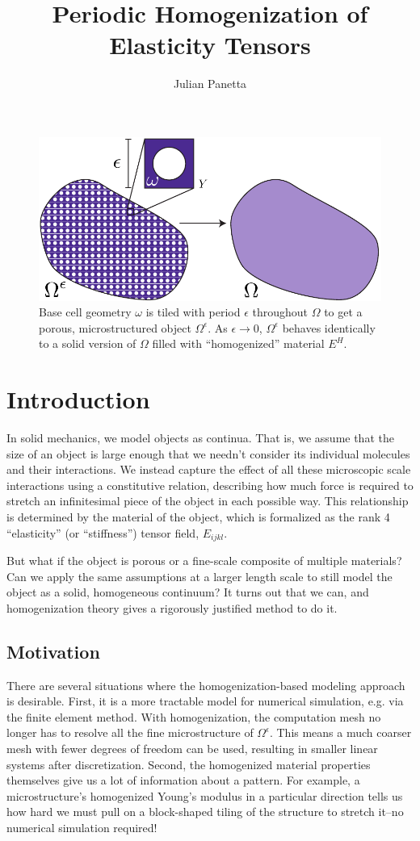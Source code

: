 \documentclass[10pt]{article}
\title{Periodic Homogenization of Elasticity Tensors}
\author{Julian Panetta}
\providecommand{\e}{\epsilon}
\begin{document}
\maketitle
    \begin{figure}[H]
        \centering
        \includegraphics[width=.75\textwidth]{Images/homogenize.pdf}
        \caption{Base cell geometry $\omega$ is tiled with period $\epsilon$
            throughout $\Omega$ to get a porous, microstructured object
        $\Omega^\epsilon$. As $\epsilon \to 0$, $\Omega^\epsilon$ behaves
        identically to a solid version of $\Omega$ filled with
        ``homogenized'' material $E^H$.}
        \label{fig:homogenization}
    \end{figure}
\section{Introduction}
In solid mechanics, we model objects as continua. That is,
we assume that the size of an object is large enough that we needn't consider
its individual molecules and their interactions. We instead capture the
effect of all these microscopic scale interactions using a constitutive
relation, describing how much force is required to stretch an infinitesimal
piece of the object in each possible way. This relationship is determined by the
material of the object, which is formalized as the rank 4 ``elasticity'' (or
``stiffness'') tensor field, $E_{ijkl}$.

But what if the object is porous or a fine-scale composite of
multiple materials? Can we apply the same assumptions at a larger length scale
to still model the object as a solid, homogeneous continuum? It turns out that
we can, and homogenization theory gives a rigorously justified method to do
it.

\subsection{Motivation}
There are several situations where the homogenization-based modeling approach
is desirable. First, it is a more tractable model for numerical simulation,
e.g. via the finite element method. With homogenization, the computation mesh
no longer has to resolve all the fine microstructure of $\Omega^\e$. This means
a much coarser mesh with fewer degrees of freedom can be used, resulting in
smaller linear systems after discretization. Second, the homogenized material
properties themselves give us a lot of information about a pattern. For example,
a microstructure's homogenized Young's modulus in a particular direction tells
us how hard we must pull on a block-shaped tiling of the structure to stretch
it--no numerical simulation required!
\end{document}
